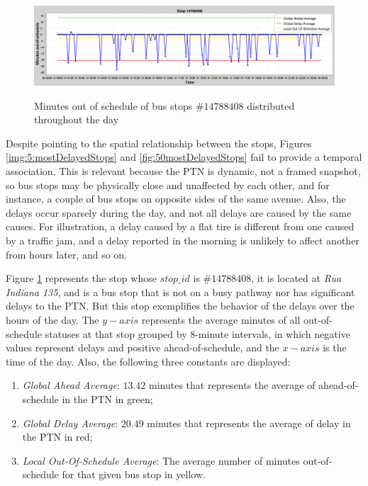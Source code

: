 \begin{figure}[b]
     \centering
        \caption{Minutes out of schedule of bus stops $\#14788408$ distributed throughout the day}
        \includegraphics[width=\textwidth]{imagem/cap5/stops1.png}
        \label{img:5:stops2}
\end{figure}

Despite pointing to the spatial relationship between the stops, Figures \ref{img:5:mostDelayedStops} and \ref{fig:50mostDelayedStops} fail to provide a temporal association. This is relevant because
the PTN is dynamic, not a framed snapshot, so bus stops may be physically close and unaffected by each other, and for instance,
a couple of bus stops on opposite sides of the same avenue.
Also, the delays occur sparsely during the day, and not all delays 
are caused by the same causes.
For illustration, a delay caused by a flat tire is different from one caused by a traffic jam, and 
a delay reported in the morning is unlikely to affect another from hours later, and so on.

Figure \ref{img:5:stops2} represents the stop whose $stop\_id$ is $\#14788408$, it is located at \textit{Rua Indiana 135}, and is a bus stop that is not on a busy pathway nor has significant delays to the PTN. But this stop exemplifies the behavior of the delays
over the hours of the day. The $y-axis$ represents the average minutes of all out-of-schedule statuses at that stop grouped by 
8-minute intervals, in which negative values represent delays and positive ahead-of-schedule, and the $x-axis$ is the time of the day. Also, the following three constants are displayed:
\begin{enumerate}
    \item \textit{Global Ahead Average}: $13.42$ minutes that represents the average of ahead-of-schedule in the PTN in green;
    \item \textit{Global Delay Average}: $20.49$ minutes that represents the average of delay in the PTN in red;
    \item \textit{Local Out-Of-Schedule Average}: The average number of minutes out-of-schedule for that given bus stop in yellow.
\end{enumerate}

